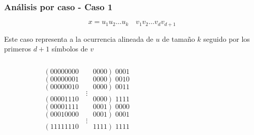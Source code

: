 \documentclass[10pt,mathserif]{beamer}%
\begin{document}
\begin{frame}
  \frametitle{Análisis por caso - Caso 1}
    $$x = u_1 u_2 \dots u_k \quad v_1 v_2 \dots v_{d} v_{d + 1}$$

  Este caso representa a la ocurrencia alineada de $u$ de tamaño $k$ seguido por los primeros $d+1$ símbolos de $v$

  \begin{columns}
    \begin{column}{0.5\textwidth}
      $$( 00000000 \qquad 0000 ) \; 0001$$
      $$( 00000001 \qquad 0000 ) \; 0010$$
      $$( 00000010 \qquad 0000 ) \; 0011$$
      $$\vdots$$
      $$( 00001110 \qquad 0000 ) \; 1111$$
      $$( 00001111 \qquad 0001 ) \; 0000$$
      $$( 00010000 \qquad 0001 ) \; 0001$$
      $$\vdots$$
      $$( 11111110 \qquad 1111 ) \; 1111$$
    \end{column}
    \begin{column}{0.5\textwidth}  %
        \begin{center}
         \end{center}
    \end{column}
    \end{columns}



\end{frame} 
\end{document}
